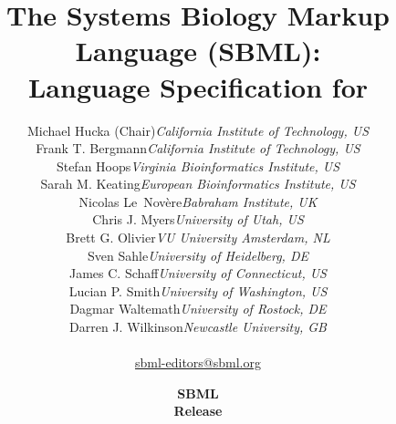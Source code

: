 
\title{{The Systems Biology Markup Language (SBML):}\\
Language Specification for \thisLV}

\author{\begin{tabular}{l>{\hspace*{15pt}}r}
Michael Hucka (Chair)	& \emph{California Institute of Technology, US}\\
Frank T. Bergmann  	& \emph{California Institute of Technology, US}\\
Stefan Hoops		& \emph{Virginia Bioinformatics Institute, US}\\
Sarah M. Keating	& \emph{European Bioinformatics Institute, US}\\
Nicolas Le~Nov\`{e}re	& \emph{Babraham Institute, UK}\\
Chris J. Myers		& \emph{University of Utah, US}\\
Brett G. Olivier	& \emph{VU University Amsterdam, NL}\\
Sven Sahle		& \emph{University of Heidelberg, DE}\\
James C. Schaff		& \emph{University of Connecticut, US}\\
Lucian P. Smith		& \emph{University of Washington, US}\\
Dagmar Waltemath	& \emph{University of Rostock, DE}\\
Darren J. Wilkinson	& \emph{Newcastle University, GB}\\[8pt]
\end{tabular}\\
\href{mailto:sbml-editors@sbml.org}{\sffamily sbml-editors@sbml.org}}

\date{\vfill \textbf{SBML \thisLV} \\[10pt]
  \textbf{Release \sbmlrelease} \\[10pt]
  \sbmldate}



\maketitle

